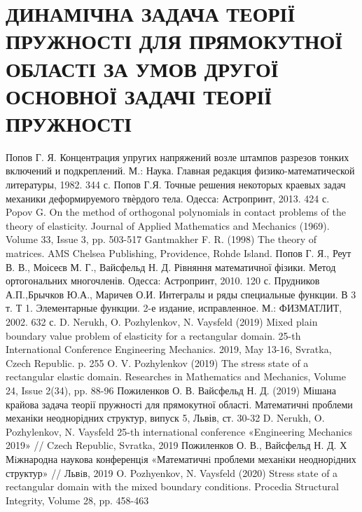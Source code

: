 \documentclass[a4paper,14pt]{extarticle}
\numberwithin{equation}{section}
\begin{document}
\section{ДИНАМІЧНА ЗАДАЧА ТЕОРІЇ ПРУЖНОСТІ ДЛЯ ПРЯМОКУТНОЇ ОБЛАСТІ
ЗА УМОВ ДРУГОЇ ОСНОВНОЇ ЗАДАЧІ ТЕОРІЇ ПРУЖНОСТІ}

\newpage

\begin{thebibliography}{1}
    Попов Г. Я. Концентрация упругих напряжений возле штампов разрезов тонких включений и подкреплений. М.: Наука. Главная редакция физико-математической литературы, 1982. 344 с.
    Попов Г.Я. Точные решения некоторых краевых задач механики деформируемого твѐрдого тела. Одесса: Астропринт, 2013. 424 с.
    Popov G. On the method of orthogonal polynomials in contact problems of the theory of elasticity. Journal of Applied Mathematics and Mechanics (1969). Volume 33, Issue 3, pp. 503-517
    Gantmakher F. R. (1998) The theory of matrices. AMS Chelsea Publishing, Providence, Rohde Island.
    Попов Г. Я., Реут В. В., Моісеєв М. Г., Вайсфельд Н. Д. Рівняння математичної фізики. Метод ортогональних многочленів. Одесса: Астропринт, 2010. 120 с.
    Прудников А.П.,Брычков Ю.А., Маричев О.И. Интегралы и ряды специальные функции. В 3 т. Т 1. Элементарные функции. 2-е издание, исправленное. М.: ФИЗМАТЛИТ, 2002. 632 с.
    D. Nerukh, O. Pozhylenkov, N. Vaysfeld (2019) Mixed plain boundary value problem of elasticity for a rectangular domain. 25-th International Conference Engineering Mechanics. 2019, May 13-16, Svratka, Czech Republic. p. 255
    O. V. Pozhylenkov (2019) The stress state of a rectangular elastic domain. Researches in Mathematics and Mechanics, Volume 24, Issue 2(34), pp. 88-96
    Пожиленков О. В. Вайсфельд Н. Д. (2019) Мішана крайова задача теорії пружності для прямокутної області. Математичні проблеми механіки неоднорідних структур, випуск 5, Львів, ст. 30-32
    D. Nerukh, O. Pozhylenkov, N. Vaysfeld 25-th international conference «Engineering Mechanics 2019» // Czech Republic, Svratka, 2019
    Пожиленков О. В., Вайсфельд Н. Д. Х Мiжнародна наукова конференцiя «Математичнi проблеми механiки неоднорiдних структур» // Львiв, 2019
    O. Pozhyenkov, N. Vaysfeld (2020) Stress state of a rectangular domain with the mixed boundary conditions. Procedia Structural Integrity, Volume 28, pp. 458-463

\end{thebibliography}
\end{document}
